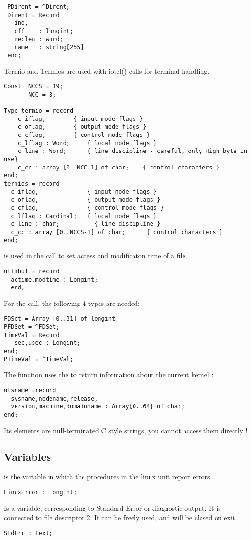 \begin{verbatim}
 PDirent = ^Dirent;
 Dirent = Record  
   ino,
   off    : longint;
   reclen : word;
   name   : string[255]
 end; 
\end{verbatim}
Termio and Termios are used with iotcl() calls for terminal handling.
\begin{verbatim}
Const  NCCS = 19;
       NCC = 8;
         
Type termio = record
	c_iflag,		{ input mode flags }
	c_oflag,		{ output mode flags }
	c_cflag,		{ control mode flags }
	c_lflag : Word;		{ local mode flags }
	c_line : Word;		{ line discipline - careful, only High byte in use}
	c_cc : array [0..NCC-1] of char;	{ control characters }
end;
termios = record
  c_iflag,              { input mode flags }
  c_oflag,              { output mode flags }
  c_cflag,              { control mode flags }
  c_lflag : Cardinal;	{ local mode flags }
  c_line : char;          { line discipline }
  c_cc : array [0..NCCS-1] of char;      { control characters }
end;
\end{verbatim}
 is used in the  call to set access and modificaton time
of a file.
\begin{verbatim}
utimbuf = record
  actime,modtime : Longint;
  end;
\end{verbatim}
For the  call, the following 4 types are needed:
\begin{verbatim}
FDSet = Array [0..31] of longint;
PFDSet = ^FDSet;
TimeVal = Record
   sec,usec : Longint;
end;
PTimeVal = ^TimeVal;
\end{verbatim}
The  function uses the  to return information about
the current kernel :
\begin{verbatim}
utsname =record
  sysname,nodename,release,
  version,machine,domainname : Array[0..64] of char;
end;
\end{verbatim}
Its elements are null-terminated C style strings, you cannot access them
directly !

%
\subsection{Variables}
 is the variable in which the procedures in the linux unit
report errors.
\begin{verbatim}
LinuxError : Longint;
\end{verbatim}
 Is a  variable, corresponding to Standard Error or
diagnostic output. It is connected to file descriptor 2. It can be freely
used, and will be closed on exit.
\begin{verbatim}
StdErr : Text;
\end{verbatim}

